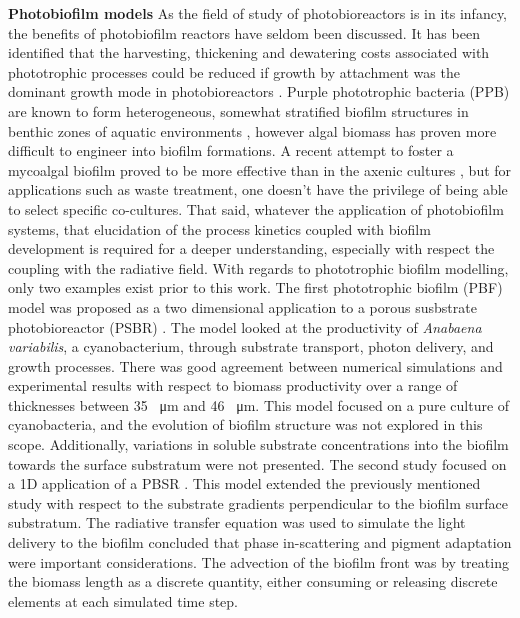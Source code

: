 \textbf{Photobiofilm models}
As the field of study of photobioreactors is in its infancy, the benefits of photobiofilm reactors have seldom been discussed. It has been identified that the harvesting, thickening and dewatering costs associated with phototrophic processes could be reduced if growth by attachment was the dominant growth mode in photobioreactors  \cite{hulsen2016a}. Purple phototrophic bacteria (PPB) are known to form heterogeneous, somewhat stratified biofilm structures in benthic zones of aquatic environments \cite{overmann2006a}, however algal biomass has proven more difficult to engineer into biofilm formations. A recent attempt to foster a mycoalgal biofilm proved to be more effective than in the axenic cultures \cite{rajendran2016}, but for applications such as waste treatment, one doesn't have the privilege of being able to select specific co-cultures. That said, whatever the application of photobiofilm systems, that elucidation of the process kinetics coupled with biofilm development is required for a deeper understanding, especially with respect the coupling with the radiative field.
\skippingparagraph
With regards to phototrophic biofilm modelling, only two examples exist prior to this work. The first phototrophic biofilm (PBF) model was proposed as a two dimensional application to a porous susbstrate photobioreactor (PSBR) \cite{murphy2014}. The model looked at the productivity of \textit{Anabaena variabilis}, a cyanobacterium, through substrate transport, photon delivery, and growth processes. There was good agreement between numerical simulations and experimental results with respect to biomass productivity over a range of thicknesses between 35 \SI{}{\micro\metre} and 46 \SI{}{\micro\metre}. This model focused on a pure culture of cyanobacteria, and the evolution of biofilm structure was not explored in this scope. Additionally, variations in soluble substrate concentrations into the biofilm towards the surface substratum were not presented. 
\skippingparagraph
The second study focused on a 1D application of a PBSR \cite{li2016}. This model extended the previously mentioned study with respect to the substrate gradients perpendicular to the biofilm surface substratum. The radiative transfer equation was used to simulate the light delivery to the biofilm concluded that phase in-scattering and pigment adaptation were important considerations. The advection of the biofilm front was by treating the biomass length as a discrete quantity, either consuming or releasing discrete elements at each simulated time step. \skippingparagraph

